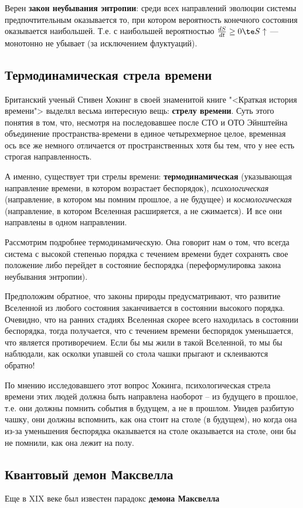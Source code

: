 \documentclass[12pt]{kiarticle}
\begin{document}
Верен \textbf{закон неубывания энтропии}: среди всех направлений эволюции системы предпочтительным оказывается то, при котором вероятность конечного состояния оказывается наибольшей. Т.е. с наибольшей вероятностью $ \frac{dS}{dt} \geq 0 \te S\uparrow $ --- монотонно не убывает (за исключением флуктуаций).

\subsection{Термодинамическая стрела времени}


Британский ученый Стивен Хокинг в своей знаменитой книге "<Краткая история времени"> выделял весьма интересную вещь: \textbf{стрелу времени}. Суть этого понятия в том, что, несмотря на последовавшее после СТО и ОТО Эйнштейна объединение пространства-времени в единое четырехмерное целое, временная ось все же немного отличается от пространственных хотя бы тем, что у нее есть строгая направленность. 

А именно, существует три стрелы времени: \textbf{термодинамическая} (указывающая направление времени, в котором возрастает беспорядок), \textit{психологическая} (направление, в котором мы помним прошлое, а не будущее) и \textit{космологическая} (направление, в котором Вселенная расширяется, а не сжимается). И все они направлены в одном направлении. 

Рассмотрим подробнее термодинамическую. Она говорит нам о том, что всегда система с высокой степенью порядка с течением времени будет сохранять свое положение либо перейдет в состояние беспорядка (переформулировка закона неубывания энтропии).

Предположим обратное, что законы природы предусматривают, что развитие Вселенной из любого состояния заканчивается в состоянии высокого порядка. Очевидно, что на ранних стадиях Вселенная скорее всего находилась в состоянии беспорядка, тогда получается, что с течением времени беспорядок уменьшается, что является противоречием. Если бы мы жили в такой Вселенной, то мы бы наблюдали, как осколки упавшей со стола чашки прыгают и склеиваются обратно! 

По мнению исследовавшего этот вопрос Хокинга, психологическая стрела времени этих людей должна быть направлена наоборот -- из будущего в прошлое, т.е. они должны помнить события в будущем, а не в прошлом. Увидев разбитую чашку, они должны вспомнить, как она стоит на столе (в будущем), но когда она из-за уменьшения беспорядка оказывается на столе оказывается на столе, они бы не помнили, как она лежит на полу. 

\subsection{Квантовый демон Максвелла}

Еще в XIX веке был известен парадокс \textbf{демона Максвелла}



%
%	
%	
\end{document}
